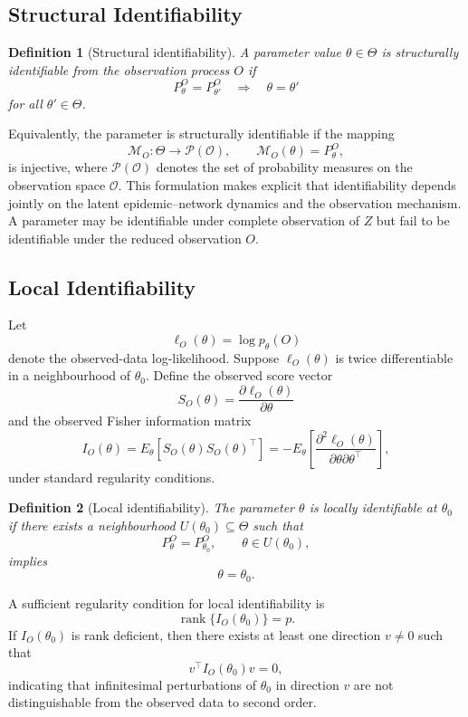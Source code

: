 \documentclass[10pt]{article}
\newtheorem{definition}{Definition}
\begin{document}
\subsection{Structural Identifiability}
\begin{definition}[Structural identifiability]
A parameter value $\theta\in\Theta$ is structurally identifiable from the observation process $O$ if
\[
P_\theta^O=P_{\theta'}^O
\quad\Longrightarrow\quad
\theta=\theta'
\]
for all $\theta'\in\Theta$.
\end{definition}

Equivalently, the parameter is structurally identifiable if the mapping
\[
\mathcal{M}_O:\Theta\to\mathcal{P}(\mathcal{O}),
\qquad
\mathcal{M}_O(\theta)=P_\theta^O,
\]
is injective, where $\mathcal{P}(\mathcal{O})$ denotes the set of probability measures on the observation space $\mathcal{O}$. This formulation makes explicit that identifiability depends jointly on the latent epidemic--network dynamics and the observation mechanism. A parameter may be identifiable under complete observation of $Z$ but fail to be identifiable under the reduced observation $O$.

\subsection{Local Identifiability}

Let
\[
\ell_O(\theta)=\log p_\theta(O)
\]
denote the observed-data log-likelihood. Suppose $\ell_O(\theta)$ is twice differentiable in a neighbourhood of $\theta_0$. Define the observed score vector
\[
S_O(\theta)=
\frac{\partial \ell_O(\theta)}{\partial\theta}
\]
and the observed Fisher information matrix
\[
I_O(\theta)=
E_\theta\left[
S_O(\theta)S_O(\theta)^\top
\right]
=
-
E_\theta\left[
\frac{\partial^2\ell_O(\theta)}
{\partial\theta\partial\theta^\top}
\right],
\]
under standard regularity conditions.

\begin{definition}[Local identifiability]
The parameter $\theta$ is locally identifiable at $\theta_0$ if there exists a neighbourhood $U(\theta_0)\subseteq\Theta$ such that
\[
P_\theta^O=P_{\theta_0}^O,
\qquad
\theta\in U(\theta_0),
\]
implies
\[
\theta=\theta_0.
\]
\end{definition}

A sufficient regularity condition for local identifiability is
\[
\operatorname{rank}\{I_O(\theta_0)\}=p.
\]
If $I_O(\theta_0)$ is rank deficient, then there exists at least one direction $v\neq0$ such that
\[
v^\top I_O(\theta_0)v=0,
\]
indicating that infinitesimal perturbations of $\theta_0$ in direction $v$ are not distinguishable from the observed data to second order.
\end{document}
